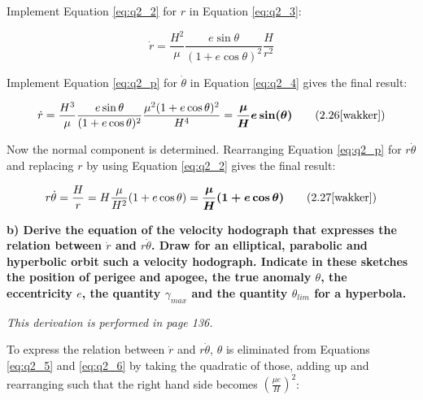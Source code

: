 \noindent Implement Equation \ref{eq:q2_2} for $r$ in Equation \ref{eq:q2_3}:

\begin{equation}
    \dot{r} = \frac{H^2}{\mu} \frac{e\sin{\theta}}{(1 + e\cos{\theta})^2} \frac{H}{r^2} 
    \label{eq:q2_4}
\end{equation}

\noindent Implement Equation \ref{eq:q2_p} for $\dot{\theta}$ in Equation \ref{eq:q2_4} gives the final result:

\begin{equation}
    \dot{r} = \frac{H^3}{\mu} \frac{e\sin{\theta}}{(1 + e\cos{\theta})^2} \frac{\mu^2(1 + e\cos{\theta})^2}{H^4} = \boldsymbol{\frac{\mu}{H} e\sin(\theta)}
    \tag{2.26\cite{wakker}}
    \label{eq:q2_5}
\end{equation}

\noindent Now the normal component is determined. Rearranging Equation \ref{eq:q2_p} for $r\dot{\theta}$ and replacing $r$ by using Equation \ref{eq:q2_2} gives the final result:

\begin{equation}
    r\dot{\theta} = \frac{H}{r} = H \frac{\mu}{H^2} (1 + e\cos{\theta}) = \boldsymbol{\frac{\mu}{H}(1 + e\cos{\theta})}
    \tag{2.27\cite{wakker}}
    \label{eq:q2_6}
\end{equation}










\noindent \textbf{b) Derive the equation of the velocity hodograph that expresses the relation between $\dot{r}$ and $r\dot{\theta}$. Draw for an elliptical, parabolic and hyperbolic orbit such a velocity hodograph. Indicate in these sketches the position of perigee and apogee, the true anomaly $\theta$, the eccentricity $e$, the quantity $\gamma_{max}$ and the quantity $\theta_{lim}$ for a hyperbola.}

\bigskip

\noindent \textit{This derivation is performed in \cite{wakker} page 136.}

\bigskip

\noindent To express the relation between $\dot{r}$ and $r\dot{\theta}$, $\theta$ is eliminated from Equations \ref{eq:q2_5} and \ref{eq:q2_6} by taking the quadratic of those, adding up and rearranging such that the right hand side becomes $(\frac{\mu e}{H})^2$:

